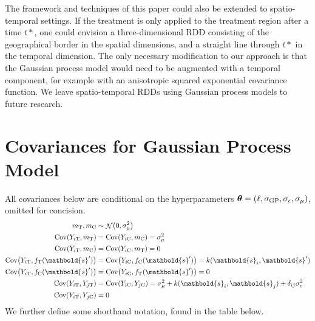 \documentclass[letter,12pt]{article}
\DeclarePairedDelimiter{\parenthesis}{\lparen}{\rparen}
\newcommand{\del}[1]{\parenthesis*{#1}}
\DeclareMathOperator{\cov}{{Cov}}
\DeclareMathOperator{\normal}{\mathcal{N}}
\newcommand{\treat}{\mathrm{T}}
\newcommand{\ctrol}{\mathrm{C}}
\newcommand{\sigmaf}{\sigma_{\mathrm{GP}}}
\newcommand{\sigman}{\sigma_{\epsilon}}
\newcommand{\sigmamu}{\sigma_{\mu}}
\newcommand{\svec}{\mathbold{s}}
\newcommand{\hyperparam}{\bm{\theta}}
\begin{document}
The framework and techniques of this paper could also be extended to spatio-temporal settings.
If the treatment is only applied to the treatment region after a time \(t*\), one could envision a three-dimensional RDD consisting of the geographical border in the spatial dimensions, and a straight line through \(t*\) in the temporal dimension.
The only necessary modification to our approach is that the Gaussian process model would need to be augmented with a temporal component, for example with an anisotropic squared exponential covariance function.
We leave spatio-temporal RDDs using Gaussian process models to future research.

\appendix

\hypertarget{covariances-for-gaussian-process-model}{%
\section{Covariances for Gaussian Process Model}\label{covariances-for-gaussian-process-model}}


\label{sec:covariances}
All covariances below are conditional on the hyperparameters \(\hyperparam = \del{\ell,\sigmaf, \sigman, \sigmamu}\), omitted for concision.
\begin{equation}
    \begin{split}
        m_\treat, m_\ctrol   &\sim \normal\del{0,\sigmamu^2} \\
        \cov(Y_{i\treat},m_\treat)  &= \cov(Y_{i\ctrol},m_\ctrol) = \sigmamu^2 \\
        \cov(Y_{i\treat},m_\ctrol)  &= \cov(Y_{i\ctrol},m_\treat)  = 0 \\
        \cov\del{Y_{i\treat}, f_{\treat}(\svec')} &= \cov\del{Y_{i\ctrol}, f_{\ctrol}(\svec')} = k(\svec_i,\svec') \\
        \cov\del{Y_{i\treat}, f_{\ctrol}(\svec')} &= \cov\del{Y_{i\ctrol}, f_{\treat}(\svec')} = 0 \\
        \cov(Y_{i\treat},Y_{j\treat}) &= \cov(Y_{i\ctrol},Y_{j\ctrol}) = \sigmamu^2 + k(\svec_i,\svec_j) + \delta_{ij}\sigman^2 \\
        \cov(Y_{i\treat},Y_{j\ctrol}) &= 0
    \end{split}
    \label{eq:covariances}
\end{equation}
We further define some shorthand notation, found in the table below.
\end{document}
